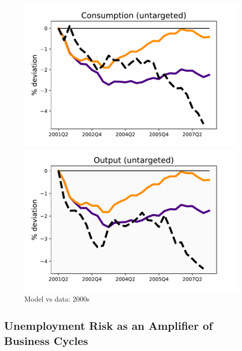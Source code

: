 \begin{figure}[H]
\medskip
\begin{minipage}{0.51\textwidth}
\includegraphics[scale=.57]{text/Chapter1/Figures/2000s/PCE_00s}
\end{minipage}\hspace*{\fill}
\begin{minipage}{0.51\textwidth}
\includegraphics[scale=.57]{text/Chapter1/Figures/2000s/GDP_00s}
\end{minipage}
\caption{Model vs data: 2000s}
\label{00s_recessions}
\end{figure}






\subsection{Unemployment Risk as an Amplifier of Business Cycles}
\label{appendix:Urisk}

